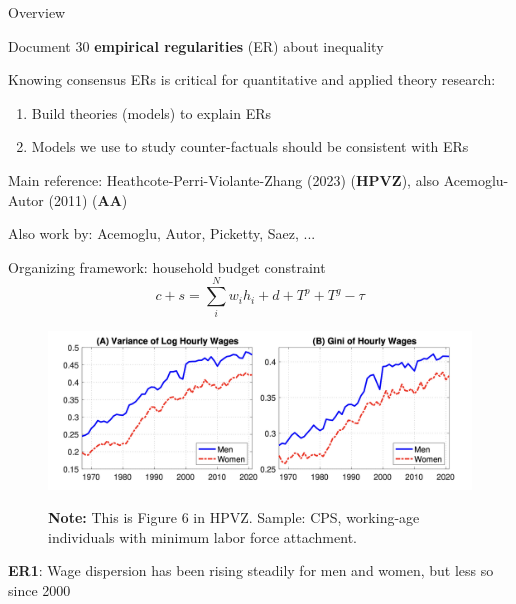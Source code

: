 \documentclass[11pt, aspectratio=169]{beamer}
\newenvironment{witemize}{\itemize\addtolength{\itemsep}{10pt}}{\enditemize}
\begin{document}
\begin{frame}{Overview}
\begin{witemize}
\item Document 30 \textbf{empirical regularities} (ER) about inequality

\item Knowing consensus ERs is critical for quantitative and applied theory research:
\begin{enumerate}
	\item Build theories (models) to explain ERs

	\item Models we use to study counter-factuals should be consistent with ERs
\end{enumerate}

\item Main reference: Heathcote-Perri-Violante-Zhang (2023) (\textbf{HPVZ}), also Acemoglu-Autor (2011) (\textbf{AA})

{\footnotesize Also work by: Acemoglu, Autor, Picketty, Saez, ...}

\item Organizing framework: household budget constraint
\begin{equation*}
	c + s = \sum_i^N w_i h_i + d + T^p + T^g - \tau
\end{equation*}

\end{witemize}
\end{frame}


\begin{frame}{}
	\begin{figure}
		\includegraphics[scale=0.35]{./figures/inequality_wage_1}
	\vspace*{-4mm}
	\begin{flushleft}
		{\scriptsize \hspace{6mm} \textbf{Note:} This is Figure 6 in HPVZ. Sample: CPS, working-age individuals with minimum labor force attachment.}
	\end{flushleft}	
	\end{figure}

	\vspace{2mm}
	{\color{blue}\textbf{ER1}}: Wage dispersion has been rising steadily for men and women, but less so since 2000
\end{frame}
\end{document}
